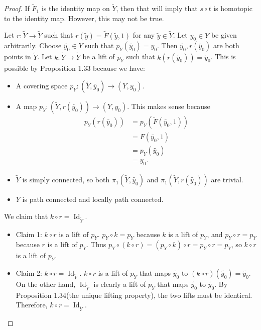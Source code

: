 \documentclass[12pt, psamsfonts]{amsart}
\theoremstyle{definition}
\theoremstyle{remark}
\DeclareMathOperator{\Id}{Id}
\numberwithin{equation}{section}
\begin{document}
\begin{proof}
  If $\tilde{F}_1$ is the identity map on $\tilde{Y}$, then that will imply that $s \circ t$ is homotopic to the identity map.
  However, this may not be true.

  Let $r: \tilde{Y} \rightarrow \tilde{Y}$ such that $r(\tilde{y}) = \tilde{F}(\tilde{y}, 1)$ for any $\tilde{y} \in \tilde{Y}$.
  Let $y_0 \in Y$ be given arbitrarily.
  Choose $\tilde{y_0} \in Y$ such that $p_Y(\tilde{y_0}) = y_0$.
  Then $\tilde{y_0}, r(\tilde{y_0})$ are both points in $\tilde{Y}$.
  Let $k: \tilde{Y} \rightarrow \tilde{Y}$ be a lift of $p_Y$ such that $k(r(\tilde{y_0})) = \tilde{y_0}$.  This is possible by Proposition 1.33 because we have:
  \begin{itemize}
    \item
      A covering space $p_Y: (\tilde{Y}, \tilde{y_0}) \rightarrow (Y, y_0)$.
    \item
      A map $p_Y: (\tilde{Y}, r(\tilde{y_0})) \rightarrow (Y, y_0)$.
      This makes sense because
      \begin{align*}
        p_Y(r(\tilde{y_0}))
          &= p_Y(\tilde{F}(\tilde{y_0}, 1)) \\
          &= F(\tilde{y_0}, 1) \\
          &= p_Y(\tilde{y_0}) \\
          &= y_0.
      \end{align*}
    \item
      $\tilde{Y}$ is simply connected, so both $\pi_1(\tilde{Y}, \tilde{y_0})$ and $\pi_1(\tilde{Y}, r(\tilde{y_0}))$ are trivial.
    \item
      $Y$ is path connected and locally path connected.
  \end{itemize}

  We claim that $k \circ r = \Id_{\tilde{Y}}$.
  \begin{itemize}
    \item
      Claim 1: $k \circ r$ is a lift of $p_Y$.
      $p_Y \circ k = p_Y$ because $k$ is a lift of $p_Y$, and $p_Y \circ r = p_Y$ because $r$ is a lift of $p_Y$.
      Thus $p_Y \circ (k \circ r) = (p_Y \circ k) \circ r = p_Y \circ r = p_Y$, so $k \circ r$ is a lift of $p_Y$.
    \item
      Claim 2: $k \circ r = \Id_{\tilde{Y}}$.
      $k \circ r$ is a lift of $p_Y$ that maps $\tilde{y_0}$ to $(k \circ r)(\tilde{y_0}) = \tilde{y_0}$.
      On the other hand, $\Id_{\tilde{Y}}$ is clearly a lift of $p_Y$ that maps $\tilde{y_0}$ to $\tilde{y_0}$.
      By Proposition 1.34(the unique lifting property), the two lifts must be identical.
      Therefore, $k \circ r = \Id_{\tilde{Y}}$.
  \end{itemize}


\end{proof}
\end{document}
